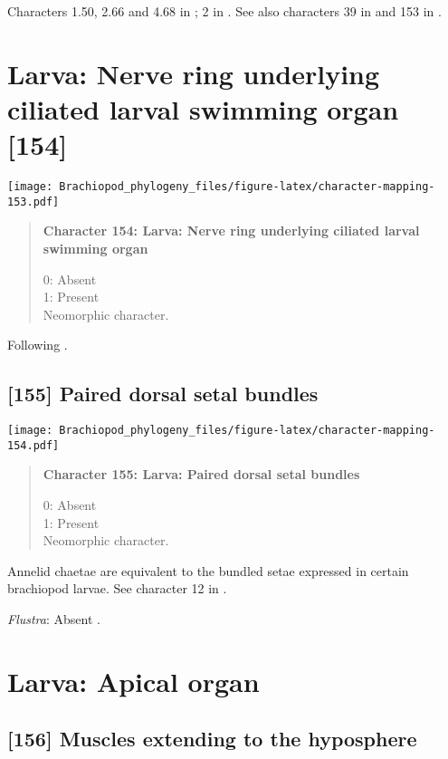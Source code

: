 \documentclass[openany]{book}
\theoremstyle{definition}
\theoremstyle{definition}
\theoremstyle{definition}
\theoremstyle{remark}
\begin{document}
Characters 1.50, 2.66 and 4.68 in \citet{SPS1996}; 2 in
\citet{Vinther2008}. See also characters 39 in \citet{Haszprunar1996}
and 153 in \citet{Giribet2002}.

\section{Larva: Nerve ring underlying ciliated larval swimming organ
{[}154{]}}\label{larva-nerve-ring-underlying-ciliated-larval-swimming-organ-154}

\texttt{[image: Brachiopod\_phylogeny\_files/figure-latex/character-mapping-153.pdf]}

\begin{quote}
\textbf{Character 154: Larva: Nerve ring underlying ciliated larval
swimming organ}

0: Absent\\
1: Present\\
Neomorphic character.
\end{quote}

Following \citet{Wanninger2009}.

\subsection*{{[}155{]} Paired dorsal setal
bundles}\label{paired-dorsal-setal-bundles}

\texttt{[image: Brachiopod\_phylogeny\_files/figure-latex/character-mapping-154.pdf]}

\begin{quote}
\textbf{Character 155: Larva: Paired dorsal setal bundles}

0: Absent\\
1: Present\\
Neomorphic character.
\end{quote}

Annelid chaetae are equivalent to the bundled setae expressed in certain
brachiopod larvae. See character 12 in \citet{Vinther2008}.

\hypertarget{Flustra-coding-155}{}
\emph{Flustra}: Absent \citep{Zimmer2013}.

\section{Larva: Apical organ}\label{larva-apical-organ}

\subsection*{{[}156{]} Muscles extending to the
hyposphere}\label{muscles-extending-to-the-hyposphere}
\end{document}
